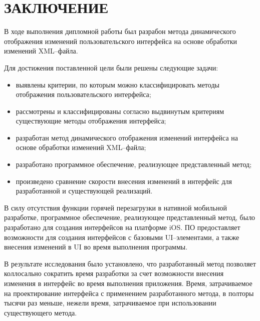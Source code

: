 \section*{ЗАКЛЮЧЕНИЕ}

В ходе выполнения дипломной работы был разрабон метода динамического отображения изменений пользовательского интерфейса на основе обработки изменений XML–файла.

Для достижения поставлен­ной цели были решены следующие задачи:

\begin{itemize}[label=---]
	\item выявлены критерии, по которым можно классифицировать методы отображения пользовательского интерфейса;
	\item рассмотрены и классифицированы согласно выдвинутым критериям существующие методы отображения интерфейса;
	\item разработан метод динамического отображения изменений интерфейса на основе обработки изменений XML--файла;
	\item разработано программное обеспечение, реализующее представленный метод;
	\item произведено сравнение скорости внесения изменений в интерфейс для разработанной и существующей реализаций.
\end{itemize}

В силу отсутствия функции горячей перезагрузки в нативной мобильной разработке, программное обеспечение, реализующее представленный метод, было разработано для создания интерфейсов на платформе iOS.
ПО предоставляет возможности для создания интерфейсов с базовыми UI--элементами, а также внесения изменений в UI во время выполнения программы.

В результате исследования было установлено, что разработанный метод позволяет коллосально сократить время разработки за счет возможности внесения изменения в интерфейс во время выполнения приложения.
Время, затрачиваемое на проектирование интерфейса с применением разработанного метода, в полторы тысячи раз меньше, нежели время, затрачиваемое при использовании существующего метода.

\pagebreak